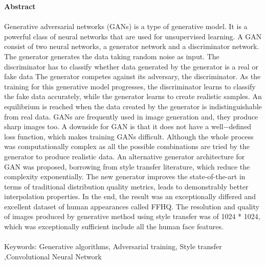 

\begin{titlepage}
\begin{center}
\textbf{\LARGE{Abstract}}\\[0.5cm] 
\end{center}
\paragraph{}
Generative adversarial networks (GANs) is a type of generative model. It is a powerful class of neural networks that are used for unsupervised learning. A GAN consist of two neural networks, a generator network and a discriminator network. The generator generates the data taking random noise as input. The discriminator has to classify whether data generated by the generator is a real or fake data The generator competes against its adversary, the discriminator. As the training for this generative model progresses, the discriminator learns to classify the fake data accurately, while the generator learns to create realistic samples. An equilibrium is reached when the data created by the generator is indistinguishable from real data. GANs are frequently used in image generation and, they produce sharp images too. A downside for GAN is that it does not have a well−defined loss function, which makes training GANs difficult. Although the whole process  was computationally complex as all the possible combinations are tried by the generator to produce realistic data. An alternative generator architecture for GAN was proposed, borrowing from style transfer literature, which reduce the complexity exponentially. The new generator improves the state-of-the-art in terms of traditional distribution quality metrics, leads to demonstrably better interpolation properties. In the end, the result was an  exceptionally differed and excellent dataset of human appearances called FFHQ. The resolution and quality of images produced by generative method using style transfer was of 1024 * 1024, which was exceptionally sufficient include all the human face features. \\\\
Keywords: Generative algorithms, Adversarial training, Style transfer ,Convolutional Neural Network
\end{titlepage}